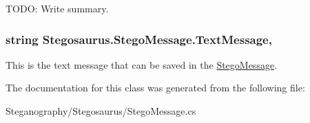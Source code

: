 T\+O\+DO\+: Write summary. 

\subsubsection[{\texorpdfstring{Text\+Message}{TextMessage}}]{\setlength{\rightskip}{0pt plus 5cm}string Stegosaurus.\+Stego\+Message.\+Text\+Message\hspace{0.3cm}{\ttfamily [get]}, {\ttfamily [set]}}\hypertarget{class_stegosaurus_1_1_stego_message_ab37f4ee21d0891f86693576a7d2bd389}{}\label{class_stegosaurus_1_1_stego_message_ab37f4ee21d0891f86693576a7d2bd389}


This is the text message that can be saved in the \hyperlink{class_stegosaurus_1_1_stego_message}{Stego\+Message}. 



The documentation for this class was generated from the following file\+:\begin{DoxyCompactItemize}
\item 
Steganography/\+Stegosaurus/Stego\+Message.\+cs\end{DoxyCompactItemize}
